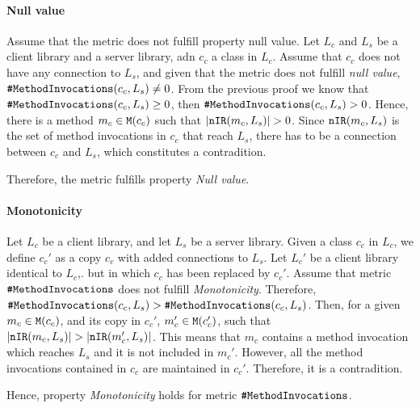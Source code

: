 \paragraph{Null value}
Assume that the metric does not fulfill property null value. Let $L_c$ and $L_s$ be a client library and a server library, adn $c_c$ a class in $L_c$. Assume that $c_c$ does not have any connection to $L_s$, and given that the metric does not fulfill \textit{null value}, $\verb|#MethodInvocations|(c_c, L_s) \neq 0$. From the previous proof we know that $\verb|#MethodInvocations|(c_c, L_s) \geq 0$, then  $\verb|#MethodInvocations|(c_c, L_s) > 0$.
Hence, there is a method $m_c \in \verb|M|(c_c)$ such that $|\verb|nIR|(m_c, L_s)| > 0$. Since $\verb|nIR|(m_c, L_s)$ is the set of method invocations in $c_c$ that reach $L_s$, there has to be a connection between $c_c$ and $L_s$, which constitutes a contradition.

Therefore, the metric fulfills property \textit{Null value}.

\paragraph{Monotonicity}
Let $L_c$ be a client library, and let $L_s$ be a server library. Given a class $c_c$ in $L_c$, we define $c_c'$ as a copy $c_c$ with added connections to $L_s$. Let $L_c'$ be a client library identical to $L_c$,. but in which $c_c$ has been replaced by $c_c'$. Assume that metric $\verb|#MethodInvocations|$ does not fulfill \textit{Monotonicity}. Therefore, $\verb|#MethodInvocations|(c_c, L_s) > \verb|#MethodInvocations|(c_c, L_s)$.
Then, for a given $m_c \in \verb|M|(c_c)$, and its copy in $c_c'$, $m_c' \in \verb|M|(c_c')$, such that $|\verb|nIR|(m_c, L_s)| > |\verb|nIR|(m_c', L_s)|$. This means that $m_c$ contains a method invocation which reaches $L_s$ and it is not included in $m_c'$. However, all the method invocations contained in $c_c$ are maintained in $c_c'$. Therefore, it is a contradition.

Hence, property \textit{Monotonicity} holds for metric $\verb|#MethodInvocations|$.
